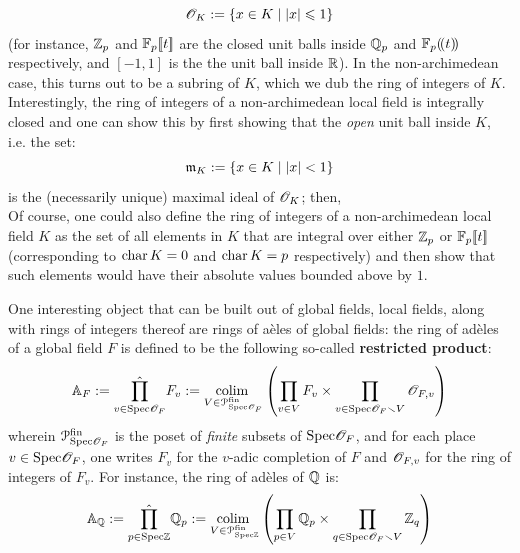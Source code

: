 \begin{example}
\begin{enumerate}
                            $$\mathscr{O}_K := \{x \in K \mid |x| \leqslant 1\}$$
                        (for instance, $\mathbb{Z}_p$ and $\mathbb{F}_p[\![t]\!]$ are the closed unit balls inside $\mathbb{Q}_p$ and $\mathbb{F}_p(\!(t)\!)$ respectively, and $[-1, 1]$ is the the unit ball inside $\mathbb{R}$). In the non-archimedean case, this turns out to be a subring of $K$, which we dub the ring of integers of $K$. Interestingly, the ring of integers of a non-archimedean local field is integrally closed and one can show this by first showing that the \textit{open} unit ball inside $K$, i.e. the set:
                            $$\mathfrak{m}_K := \{x \in K \mid |x| < 1\}$$
                        is the (necessarily unique) maximal ideal of $\mathscr{O}_K$; then, 
                        \\
                        Of course, one could also define the ring of integers of a non-archimedean local field $K$ as the set of all elements in $K$ that are integral over either $\mathbb{Z}_p$ or $\mathbb{F}_p[\![t]\!]$ (corresponding to $\operatorname{char} K = 0$ and $\operatorname{char} K = p$ respectively) and then show that such elements would have their absolute values bounded above by $1$. 
                    \end{enumerate}
                    
                    One interesting object that can be built out of global fields, local fields, along with rings of integers thereof are rings of a\`eles of global fields: the ring of ad\`eles of a global field $F$ is defined to be the following so-called \textbf{restricted product}:
                        $$\A_F := \hat{\prod_{v \in \Spec \scrO_F}} F_v := \underset{V \in \calP^{\fin}_{\Spec \scrO_F}}{\colim} \left(\prod_{v \in V} F_v \x \prod_{v \in \Spec \scrO_F \setminus V} \scrO_{F, v}\right)$$
                    wherein $\mathcal{P}^{\mathrm{fin}}_{\mathrm{Spec} \mathscr{O}_F}$ is the poset of \textit{finite} subsets of $\mathrm{Spec} \mathscr{O}_F$, and for each place $v \in \mathrm{Spec} \mathscr{O}_F$, one writes $F_v$ for the $v$-adic completion of $F$ and $\mathscr{O}_{F, v}$ for the ring of integers of $F_v$. For instance, the ring of ad\`eles of $\mathbb{Q}$ is:
                        $$\A_{\Q} := \hat{\prod_{p \in \Spec \Z}} \Q_p := \underset{V \in \calP^{\fin}_{\Spec \Z}}{\colim} \left(\prod_{p \in V} \Q_p \x \prod_{q \in \Spec \scrO_F \setminus V} \Z_q\right)$$
                \end{example}

